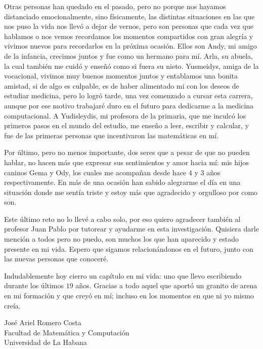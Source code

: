 \begin{acknowledgements}
	Otras personas han quedado en el pasado, pero no porque nos hayamos distanciado emocionalmente, sino físicamente, las distintas situaciones en las que nos puso la vida nos llevó a dejar de vernos, pero son personas que cada vez que hablamos o nos vemos recordamos los momentos compartidos con gran alegría y vivimos nuevos para recordarlos en la próxima ocasión. Ellos son Andy, mi amigo de la infancia, crecimos juntos y fue como un hermano para mí. Arla, su abuela, la cual también me cuidó y enseñó como si fuera su nieto. Yusmeidys, amiga de la vocacional, vivimos muy buenos momentos juntos y entablamos una bonita amistad, si de algo es culpable, es de haber alimentado mi  con los deseos de estudiar medicina, pero lo logró tarde, una vez comenzado a cursar esta carrera, aunque por ese motivo trabajaré duro en el futuro para dedicarme a la medicina computacional. A Yudisleydis, mi profesora de la primaria, que me inculcó los primeros pasos en el mundo del estudio, me enseño a leer, escribir y calcular, y fue de las primeras personas que incentivaron las matemáticas en mí.
	
	Por último, pero no menos importante, dos seres que a pesar de que no pueden hablar, no hacen más que expresar sus sentimientos y amor hacia mí: mis hijos caninos Gema y Ody, los cuales me acompañan desde hace $4$ y $3$ años respectivamente. En más de una ocasión han sabido alegrarme el día en una situación donde me sentía triste y estoy más que agradecido y orgulloso por como son.
	
	Este último reto no lo llevé a cabo solo, por eso quiero agradecer también al profesor Juan Pablo por tutorear y ayudarme en esta investigación. Quisiera darle mención a todos pero no puedo, son muchos los que han aparecido y estado presente en mi vida. Espero que sigamos relacionándonos en el futuro, junto con las nuevas personas que conoceré.
	
	\begin{phrase}[3in]
		Indudablemente hoy cierro un capítulo en mi vida: uno que llevo escribiendo durante los últimos $19$ años. Gracias a todo aquel que aportó un granito de arena en mi formación y que creyó en mí; incluso en los momentos en que ni yo mismo creía.
	\end{phrase}
	
	\begin{flushright}
		José Ariel Romero Costa \\
		Facultad de Matemática y Computación \\
		Universidad de La Habana
	\end{flushright}
\end{acknowledgements}